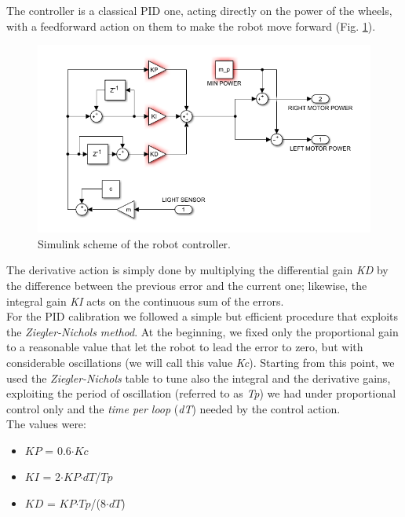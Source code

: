 \documentclass[a4paper,11pt,oneside]{book}
\begin{document}
			The controller is a classical PID one, acting directly on the power of the wheels, with a feedforward action on them to make the robot move forward (Fig. \ref{fig:PID_fig.png}).
			\begin{figure} [H]
				\includegraphics{figs/PID_fig.png}
				\caption{Simulink scheme of the robot controller.}\label{fig:PID_fig.png}
			\end{figure}
			
			The derivative action is simply done by multiplying the differential gain \emph{KD} by the difference between the previous error and the current one; likewise, the integral gain \emph{KI} acts on the continuous sum of the errors.\\
	
			For the PID calibration we followed a simple but efficient procedure that exploits the \emph{Ziegler-Nichols method}.
			At the beginning, we fixed only the proportional gain to a reasonable value that let the robot to lead the error to zero, but with considerable oscillations (we will call this value \emph{Kc}). Starting from this point, we used the \emph{Ziegler-Nichols} table to tune also the integral and the derivative gains, exploiting the period of oscillation (referred to as \emph{Tp}) we had under proportional control only and the \emph{time per loop} (\emph{dT}) needed by the control action.\\
			The values were:
			\begin{itemize}
				\item $\mathit{KP}$ = 0.6$\cdot$$\mathit{Kc}$
				\item $\mathit{KI}$ = 2$\cdot$$\mathit{KP}$$\cdot$$\mathit{dT}$/$\mathit{Tp}$
				\item $\mathit{KD}$ = $\mathit{KP}$$\cdot$$\mathit{Tp}$/(8$\cdot$$\mathit{dT}$)
			\end{itemize}
		
\end{document}
